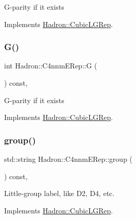 G-\/parity if it exists 

Implements \mbox{\hyperlink{structHadron_1_1CubicLGRep_ace26f7b2d55e3a668a14cb9026da5231}{Hadron\+::\+Cubic\+L\+G\+Rep}}.

\mbox{\label{structHadron_1_1C4nnmERep_aeebb3eed0a37633aded692d6d5929f84}} 
\subsubsection{\texorpdfstring{G()}{G()}\hspace{0.1cm}{\footnotesize\ttfamily [2/2]}}
{\footnotesize\ttfamily int Hadron\+::\+C4nnm\+E\+Rep\+::G (\begin{DoxyParamCaption}{ }\end{DoxyParamCaption}) const\hspace{0.3cm}{\ttfamily [inline]}, {\ttfamily [virtual]}}

G-\/parity if it exists 

Implements \mbox{\hyperlink{structHadron_1_1CubicLGRep_ace26f7b2d55e3a668a14cb9026da5231}{Hadron\+::\+Cubic\+L\+G\+Rep}}.

\mbox{\label{structHadron_1_1C4nnmERep_a45a936a694de501cfdb433b97302755a}} 
\subsubsection{\texorpdfstring{group()}{group()}\hspace{0.1cm}{\footnotesize\ttfamily [1/2]}}
{\footnotesize\ttfamily std\+::string Hadron\+::\+C4nnm\+E\+Rep\+::group (\begin{DoxyParamCaption}{ }\end{DoxyParamCaption}) const\hspace{0.3cm}{\ttfamily [inline]}, {\ttfamily [virtual]}}

Little-\/group label, like D2, D4, etc. 

Implements \mbox{\hyperlink{structHadron_1_1CubicLGRep_a9bdb14b519a611d21379ed96a3a9eb41}{Hadron\+::\+Cubic\+L\+G\+Rep}}.

\mbox{\label{structHadron_1_1C4nnmERep_a45a936a694de501cfdb433b97302755a}} 

